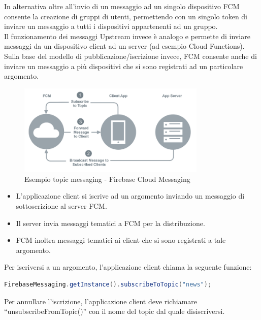 In alternativa oltre all'invio di un messaggio ad un singolo dispositivo FCM consente la creazione di gruppi di utenti, permettendo con un singolo token di inviare un messaggio a tutti i dispositivi appartenenti ad un gruppo.\\
Il funzionamento dei messaggi Upstream invece è analogo e permette di inviare messaggi da un dispositivo client ad un server (ad esempio Cloud Functions).\\
Sulla base del modello di pubblicazione/iscrizione invece, FCM consente anche di inviare un messaggio a più dispositivi che si sono registrati ad un particolare argomento.

\begin{figure}[!hb]
  \centering
  \includegraphics[width=0.8\textwidth]{immagini/fcm_topic.png}
  \caption{Esempio topic messaging - Firebase Cloud Messaging}\label{fig:Esempio topic messaging - Firebase Cloud Messaging}
\end{figure}

    \begin{itemize}
        \item L'applicazione client si iscrive ad un argomento inviando un messaggio di sottoscrizione al server FCM.
        \item Il server invia messaggi tematici a FCM per la distribuzione.
        \item FCM inoltra messaggi tematici ai client che si sono registrati a tale argomento.
    \end{itemize}

Per iscriversi a un argomento, l'applicazione client chiama la seguente funzione:

\begin{lstlisting}[language=java,caption={FCM topic}]
 FirebaseMessaging.getInstance().subscribeToTopic("news");
\end{lstlisting}

Per annullare l'iscrizione, l'applicazione client deve richiamare ``unsubscribeFromTopic()'' con il nome del topic dal quale disiscriversi.


